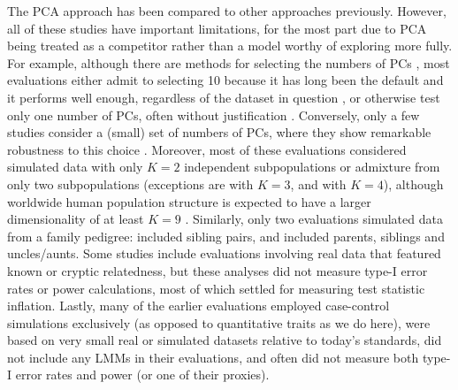 \documentclass[11pt]{article}
\begin{document}
The PCA approach has been compared to other approaches previously.
However, all of these studies have important limitations, for the most part due to PCA being treated as a competitor rather than a model worthy of exploring more fully.
For example, although there are methods for selecting the numbers of PCs \citep{patterson_population_2006}, most evaluations either admit to selecting 10 because it has long been the default and it performs well enough, regardless of the dataset in question \citep{epstein_simple_2007, li_improved_2008, astle_population_2009, li_correcting_2010, wu_comparison_2011}, or otherwise test only one number of PCs, often without justification \citep{zhang_semiparametric_2003, kimmel_randomization_2007, zhao_arabidopsis_2007, zhang_comparison_2008, price_new_2010, bouaziz_accounting_2011, hoffman_correcting_2013, wang_analytical_2013, tucker_improving_2014, yang_advantages_2014, song_testing_2015, sul_population_2018}.
Conversely, only a few studies consider a (small) set of numbers of PCs, where they show remarkable robustness to this choice \citep{price_principal_2006, kang_variance_2010, wojcik_genetic_2019}.
Moreover, most of these evaluations considered simulated data with only $K = 2$ independent subpopulations or admixture from only two subpopulations (exceptions are \citet{astle_population_2009} with $K=3$, and \citet{wu_comparison_2011, wang_analytical_2013} with $K = 4$), although worldwide human population structure is expected to have a larger dimensionality of at least $K = 9$ \citep{wojcik_genetic_2019}.
Similarly, only two evaluations simulated data from a family pedigree: \citet{price_new_2010} included sibling pairs, and \citet{thornton_roadtrips:_2010} included parents, siblings and uncles/aunts.
Some studies include evaluations involving real data that featured known or cryptic relatedness, but these analyses did not measure type-I error rates or power calculations, most of which settled for measuring test statistic inflation.
Lastly, many of the earlier evaluations employed case-control simulations exclusively (as opposed to quantitative traits as we do here), were based on very small real or simulated datasets relative to today's standards, did not include any LMMs in their evaluations, and often did not measure both type-I error rates and power (or one of their proxies).
\end{document}
